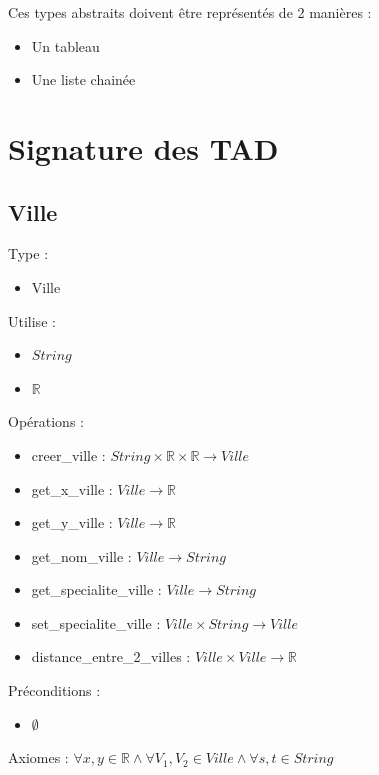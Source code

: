 \documentclass[a4paper, 11pt, oneside]{article}
\begin{document}
Ces types abstraits doivent être représentés de 2 manières :
\begin{itemize}
    \item Un tableau
    \item Une liste chainée
\end{itemize}

\section{\textbf{Signature des TAD}}

\subsection{\textbf{Ville}}

\noindent Type :
\begin{itemize}
    \item Ville
\end{itemize}
\noindent Utilise :
\begin{itemize}
    \item $String$
    \item $\mathbb{R}$
\end{itemize}
\noindent Opérations :
\begin{itemize}
    \item creer\_ville : $String \times \mathbb{R} \times \mathbb{R} \rightarrow Ville$
    \item get\_x\_ville : $Ville \rightarrow \mathbb{R}$
    \item get\_y\_ville : $Ville \rightarrow \mathbb{R}$
    \item get\_nom\_ville : $Ville \rightarrow String$
    \item get\_specialite\_ville : $Ville \rightarrow String$
    \item set\_specialite\_ville : $Ville \times String \rightarrow Ville$
    \item distance\_entre\_2\_villes : $Ville \times Ville \rightarrow \mathbb{R}$
\end{itemize}
\noindent Préconditions :
\begin{itemize}
    \item $\emptyset$
\end{itemize}
\noindent Axiomes : $\forall x,y \in \mathbb{R} \wedge \forall V_1, V_2 \in Ville \wedge \forall s,t \in String$
\end{document}
